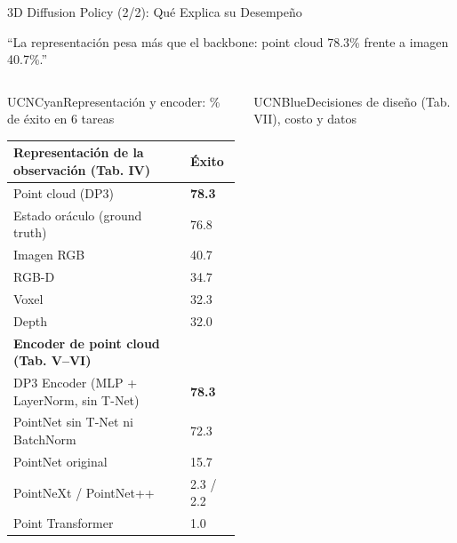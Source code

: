 \documentclass[aspectratio=169,10pt,xcolor={dvipsnames,table}]{beamer}
\newcommand{\BannerFont}{\fontsize{7.5}{9.2}\selectfont\bfseries}       %
\newcommand{\BannerArc}{1.5pt}             %
\newcommand{\BannerRule}{0.5pt}            %
\newcommand{\BannerLeftRule}{2.5pt}        %
\newcommand{\CardHeightTall}{46mm}         %
\newcommand{\BannerCentral}[2][UCNCyan]{%
  \begin{tcolorbox}[
    enhanced,
    colback=#1!10,
    colframe=#1,
    boxrule=\BannerRule,
    leftrule=\BannerLeftRule,
    arc=\BannerArc,
    top=0.35mm, bottom=0.35mm, left=2mm, right=2mm
  ]
    {\BannerFont\raggedright\textcolor{UCNBlue}{#2}\par}
  \end{tcolorbox}%
  \vspace{-2.5mm}%
}
\newcommand{\BannerRef}[1]{{\mdseries\fontsize{5}{6}\selectfont\textcolor{TextDark!65}{\cite{#1}}}} %
\newcommand{\TabFont}{\fontsize{5.3}{6.4}\selectfont}                    %
\begin{document}
\begin{frame}{3D Diffusion Policy (2/2): Qué Explica su Desempeño}
  \BannerCentral[UCNCyan]{``La representación pesa más que el backbone: point cloud 78.3\% frente a imagen 40.7\%.'' \BannerRef{ze2024dp3}}
  \vspace{0.8mm}
  \begin{columns}[T, onlytextwidth]
    \begin{column}{0.49\textwidth}
      \begin{Card}[height=\CardHeightTall]{UCNCyan}{Representación y encoder: \% de éxito en 6 tareas}
        {\TabFont
        \setlength{\tabcolsep}{1.4pt}
        \renewcommand{\arraystretch}{1.0}
        \begin{tabular}{@{}L{50mm} C{14mm}@{}}
          \toprule
          \textbf{Representación de la observación (Tab. IV)} & \textbf{Éxito} \\
          \midrule
           Point cloud (DP3) & \textbf{78.3} \\
          Estado oráculo (ground truth) & 76.8 \\
          Imagen RGB & 40.7 \\
          RGB-D & 34.7 \\
          Voxel & 32.3 \\
          Depth & 32.0 \\
          \midrule
          \textbf{Encoder de point cloud (Tab. V--VI)} & \\
          \midrule
           DP3 Encoder (MLP + LayerNorm, sin T-Net) & \textbf{78.3} \\
          PointNet sin T-Net ni BatchNorm & 72.3 \\
          PointNet original & 15.7 \\
          PointNeXt / PointNet++ & 2.3 / 2.2 \\
          Point Transformer & 1.0 \\
          \bottomrule
        \end{tabular}\par}
      \end{Card}
    \end{column}
    \begin{column}{0.49\textwidth}
      \begin{Card}[height=\CardHeightTall]{UCNBlue}{Decisiones de diseño (Tab. VII), costo y datos}

\end{Card}
\end{column}
\end{columns}
\end{frame}
\end{document}
